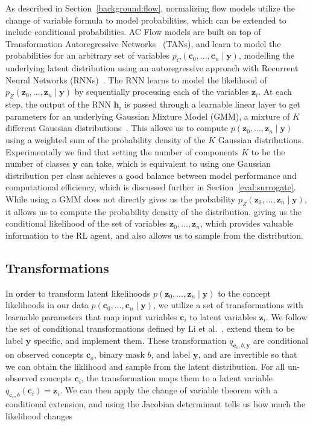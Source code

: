 \documentclass[../main.tex]{subfiles}
\begin{document}
As described in Section~\ref{background:flow}, 
normalizing flow models utilize the change of variable formula to model probabilities,
which can be extended to include conditional probabilities. AC Flow models are built on top of
Transformation Autoregressive
Networks~\cite{tans} (TANs), and learn to model 
the probabilities for an arbitrary set of variables $p_C(\mathbf{c}_0,\ldots, \mathbf{c}_n \mid \mathbf{y})$,
modelling the underlying latent distribution using an autoregressive approach with Recurrent
Neural Networks (RNNs)~\cite{rnn}. The RNN learns to model the likelihood of 
$p_Z(\mathbf{z}_0, \ldots, \mathbf{z}_n \mid \mathbf{y})$ by sequentially processing each of the variables $\mathbf{z}_i$.
At each step, the output of the RNN $\mathbf{h}_i$ is 
passed through a learnable linear layer to get parameters for an underlying Gaussian Mixture Model (GMM),
a mixture of $K$ different Gaussian distributions~\cite{gmm}.
This allows us to compute $p(\mathbf{z}_0, \ldots, \mathbf{z}_n \mid \mathbf{y})$ 
using a weighted
sum of the probability density of the $K$ Gaussian distributions. Experimentally
we find that setting the number of components $K$ to be the number of classes 
$\mathbf{y}$ can take, which is equivalent to using one Gaussian distribution per 
class 
achieves
a good balance between model performance and computational efficiency,
which is discussed further in Section~\ref{eval:surrogate}.
While using a GMM does not directly gives us the probability
$p_Z(\mathbf{z}_0, \ldots, \mathbf{z}_n \mid \mathbf{y})$, it allows us to compute the probability density of the distribution, giving 
us the conditional likelihood of the set of variables $\mathbf{z}_0, \ldots, \mathbf{z}_n$, which provides valuable information
to the RL agent, and also allows us to sample from the distribution.

\subsection{Transformations}
In order to transform latent likelihoods $p(\mathbf{z}_0, \ldots, \mathbf{z}_n \mid \mathbf{y})$ to 
the concept likelihoods in our data
$p(\mathbf{c}_0,\ldots, \mathbf{c}_n \mid \mathbf{y})$, we
utilize a set of transformations with learnable parameters that 
map input variables $\mathbf{c}_i$ to latent variables $\mathbf{z}_i$. We follow the 
set of conditional transformations defined by Li et al.~\cite{acflow}, extend them to
be label $\mathbf{y}$ specific, and implement them.
These transformation $q_{\mathbf{c}_o, b, \mathbf{y}}$ are
conditional on 
observed concepts $\mathbf{c}_o$, binary mask $b$, and label $\mathbf{y}$, 
and are invertible so that we can obtain the liklihood and 
sample from the latent distribution. 
For all un-observed concepts $\mathbf{c}_i$,
the transformation maps them to a latent variable $q_{\mathbf{c}_o, b}(\mathbf{c}_i) = \mathbf{z}_i$. 
We can then apply the change
of variable theorem with a conditional extension, and using
the Jacobian determinant tells us how much the likelihood changes~\cite{normalizing-flows}
\end{document}
